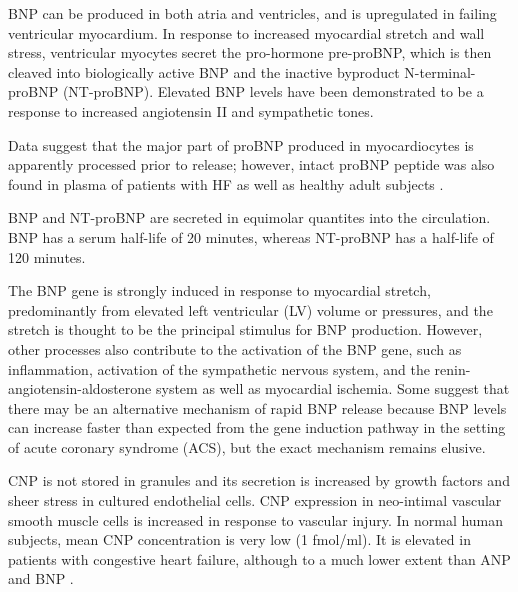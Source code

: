 \documentclass[14pt,a4paper,onecolumn]{extarticle}
\begin{document}

BNP can be produced in both atria and ventricles, and is upregulated in failing ventricular myocardium. In response to increased myocardial stretch and wall stress, ventricular myocytes secret the pro-hormone pre-proBNP, which is then cleaved into biologically active BNP and the inactive byproduct N-terminal-proBNP (NT-proBNP). Elevated BNP levels have been demonstrated to be a response to increased angiotensin II and sympathetic tones. \citep{Iwanaga2006} %

Data suggest that the major part of proBNP produced in myocardiocytes is apparently processed prior to release; however, intact proBNP peptide was also found in plasma of patients with HF as well as healthy adult subjects \citep{14}. %

BNP and NT-proBNP are secreted in equimolar quantites into the circulation.  BNP has a serum half-life of 20 minutes, whereas NT-proBNP has a half-life of 120 minutes. \citep{DanielsandMaisel2007} %

The BNP gene is strongly induced in response to myocardial stretch, predominantly from elevated left ventricular (LV) volume or pressures, and the stretch is thought to be the principal stimulus for BNP production. However, other processes also contribute to the activation of the BNP gene, such as inflammation, activation of the sympathetic nervous system, and the renin-angiotensin-aldosterone system as well as myocardial ischemia. Some suggest that there may be an alternative mechanism of rapid BNP release because BNP levels can increase faster than expected from the gene induction pathway in the setting of acute coronary syndrome (ACS), but the exact mechanism remains elusive. \citep{Gaggin2014} %

CNP is not stored in granules and its secretion is increased by growth factors and sheer stress in cultured endothelial cells. CNP expression in neo-intimal vascular smooth muscle cells is increased in response to vascular injury. In normal human subjects, mean CNP concentration is very low (1 fmol/ml). It is elevated in patients with congestive heart failure, although to a much lower extent than ANP and BNP \citep{Charles2006} \citep{Del-Ry2005} \citep{Kalra2003}. %
\end{document}
